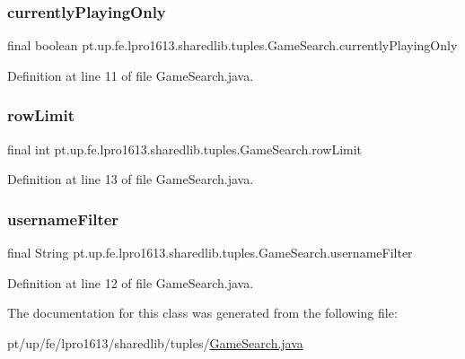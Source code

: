\subsubsection{\texorpdfstring{currently\+Playing\+Only}{currentlyPlayingOnly}}
{\footnotesize\ttfamily final boolean pt.\+up.\+fe.\+lpro1613.\+sharedlib.\+tuples.\+Game\+Search.\+currently\+Playing\+Only}



Definition at line 11 of file Game\+Search.\+java.

\hypertarget{classpt_1_1up_1_1fe_1_1lpro1613_1_1sharedlib_1_1tuples_1_1_game_search_aca81e22172ef90ab183e08ba3a419773}{}\label{classpt_1_1up_1_1fe_1_1lpro1613_1_1sharedlib_1_1tuples_1_1_game_search_aca81e22172ef90ab183e08ba3a419773} 
\subsubsection{\texorpdfstring{row\+Limit}{rowLimit}}
{\footnotesize\ttfamily final int pt.\+up.\+fe.\+lpro1613.\+sharedlib.\+tuples.\+Game\+Search.\+row\+Limit}



Definition at line 13 of file Game\+Search.\+java.

\hypertarget{classpt_1_1up_1_1fe_1_1lpro1613_1_1sharedlib_1_1tuples_1_1_game_search_a11ad6852752acf4f5e607207aca305fa}{}\label{classpt_1_1up_1_1fe_1_1lpro1613_1_1sharedlib_1_1tuples_1_1_game_search_a11ad6852752acf4f5e607207aca305fa} 
\subsubsection{\texorpdfstring{username\+Filter}{usernameFilter}}
{\footnotesize\ttfamily final String pt.\+up.\+fe.\+lpro1613.\+sharedlib.\+tuples.\+Game\+Search.\+username\+Filter}



Definition at line 12 of file Game\+Search.\+java.



The documentation for this class was generated from the following file\+:\begin{DoxyCompactItemize}
\item 
pt/up/fe/lpro1613/sharedlib/tuples/\hyperlink{_game_search_8java}{Game\+Search.\+java}\end{DoxyCompactItemize}
